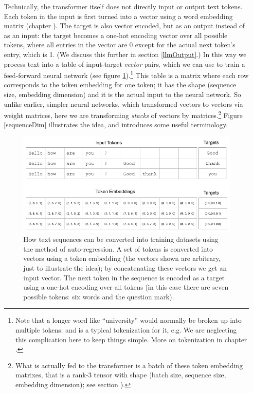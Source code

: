 Technically, the transformer itself does not directly input or output text
tokens. Each token in the input is first turned into a vector using a word
embedding matrix (chapter ). The target is also
vector encoded, but as an output instead of as an input: the target becomes a
one-hot encoding vector over all possible tokens, where all entries in the
vector are 0 except for the actual next token's entry, which is 1. (We discuss
this further in section \ref{llmOutput}.) In this way we process text into a
table of input-target \emph{vector} pairs, which we can use to train a
feed-forward neural network (see figure
\ref{nextWordPrediction}).\footnote{Note that a longer word like ``university''
would normally be broken up into multiple tokens:  and 
is a typical tokenization for it, e.g. We are neglecting this complication here
to keep things simple. More on tokenization in chapter
.} This table is a matrix where each row corresponds
to the token embedding for one token; it has the shape (sequence size,
embedding dimension) and it is the actual input to the neural network. So
unlike earlier, simpler neural networks, which transformed vectors to vectors
via weight matrices, here we are transforming \emph{stacks} of vectors by
matrices.\footnote{What is actually fed to the transformer is a batch of these
token embedding matrixes, that is a rank-3 tensor with shape (batch size,
sequence size, embedding dimension); see section ).}
Figure \ref{sequenceDim} illustrates the idea, and introduces some
useful terminology.

\begin{figure}[ht]
\centering
\includegraphics[scale=.45]{./images/contextWindow.png}
\caption[Jeff Yoshimi]{How text sequences can be converted into training
datasets using the method of auto-regression. A set of tokens is converted into
vectors using a token embedding (the vectors shown are arbitrary, just to
illustrate the idea); by concatenating these vectors we get an input vector.
The next token in the sequence is encoded as a target using a one-hot encoding
over all tokens (in this case there are seven possible tokens: six words and
the question mark).}
\label{nextWordPrediction}
\end{figure}

